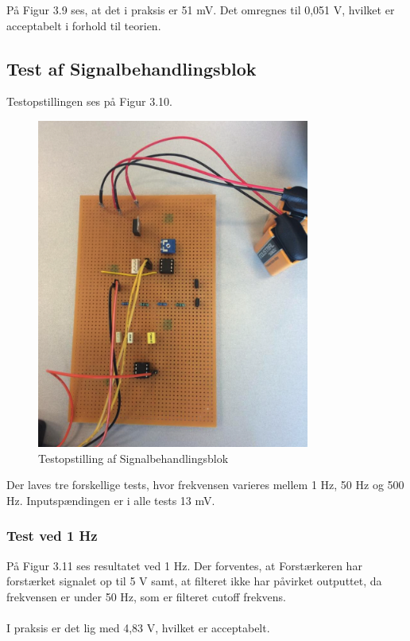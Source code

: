 På Figur 3.9 ses, at det i praksis er 51 mV. Det omregnes til 0,051 V, hvilket er acceptabelt i forhold til teorien. 

\subsection{Test af Signalbehandlingsblok}

Testopstillingen ses på Figur 3.10. 

\begin{figure}[H]
	\centering
	\includegraphics[width=0.8\textwidth]{Figurer/Snip20151207_46}
	\caption{Testopstilling af Signalbehandlingsblok}
	\label{fig:Signalsbehanlding}
\end{figure}

Der laves tre forskellige tests, hvor frekvensen varieres mellem 1 Hz, 50 Hz og 500 Hz. Inputspændingen er i alle tests 13 mV. 
\\
\subsubsection{Test ved 1 Hz}
På Figur 3.11 ses resultatet ved 1 Hz. Der forventes, at Forstærkeren har forstærket signalet op til 5 V samt, at filteret ikke har påvirket outputtet, da frekvensen er under 50 Hz, som er filteret cutoff frekvens.
\\ \\
I praksis er det lig med 4,83 V, hvilket er acceptabelt.  
 

